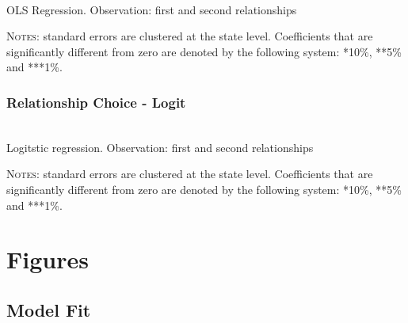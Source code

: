 \documentclass[12pt]{article}
\numberwithin{table}{section}
\begin{document}

	\begin{table}[H]\centering
	\caption{\\OLS Regression. Observation: first and second relationships}
	\label{table:wmarlinc}
	\begin{threeparttable}[t]\centering
	
	\begin{tablenotes}[flushleft]
	\footnotesize{\item \textsc{Notes}: standard errors are clustered at the state level.
		Coefficients that are significantly different from zero are denoted by the following system: *10\%, **5\%  and ***1\%.}
	\end{tablenotes}
	\end{threeparttable}
	\end{table}
\FloatBarrier

\FloatBarrier
\subsubsection*{Relationship Choice - Logit}

	\begin{table}[H]\centering
	\caption{\\Logitstic regression. Observation: first and second relationships}
	\label{table:wmar_logit}
	\begin{threeparttable}[t]\centering
	
	\begin{tablenotes}[flushleft]
	\footnotesize{\item \textsc{Notes}: standard errors are clustered at the state level.
		Coefficients that are significantly different from zero are denoted by the following system: *10\%, **5\%  and ***1\%.}
	\end{tablenotes}
	\end{threeparttable}
	\end{table}
\FloatBarrier

\newpage

\section{Figures}


\subsection{Model Fit}
\end{document}
